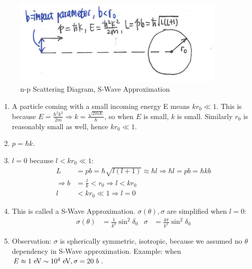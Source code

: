 \documentclass{school-22.101-notes}
\begin{document}
\begin{figure}[ht]
    \centering
    \includegraphics[width=4in]{images/scattering/np-scattering-diagram.png}
    \caption{n-p Scattering Diagram, S-Wave Approximation}
\end{figure}
\begin{enumerate}
\item A particle coming with a small incoming energy E means $k r_0 \ll 1$. This is because $E = \frac{\hbar^2 k^2}{2m} \Rightarrow k = \frac{\sqrt{2mE}}{\hbar}$, so when $E$ is small, $k$ is small. Similarly $r_0$ is reasonably small as well, hence $k r_0 \ll 1$. 

\item $ p = \hbar k$. 

\item $l=0$ because $l<kr_0 \ll 1$:
\begin{align}
L &= pb = \hbar \sqrt{l (l+1)} \approx \hbar l \Rightarrow \hbar l = pb = \hbar k b \\
\Rightarrow b &= \frac{l}{k} < r_0 \Rightarrow l < kr_0 \\
l &< k r_0 \ll 1 \Rightarrow l = 0
\end{align}

\item This is called a S-Wave Approximation. $\sigma (\theta), \sigma$ are simplified when $l=0$:
\begin{align}
\sigma (\theta) &= \frac{1}{k^2} \sin^2 \delta_0 & \sigma &= \boxed{ \frac{4 \pi}{k^2} \sin^2 \delta_0 } \label{sigma}
\end{align}

\item Observation: $\sigma$ is spherically symmetric, isotropic, because we assumed no $\theta$ dependency in S-Wave approximation. Example: when $E \approx 1 \mbox{ } \mathrm{eV} \sim 10^4 \mbox{ } \mathrm{eV}, \sigma = 20 \mbox{ } b$. 


\end{enumerate}
\end{document}
